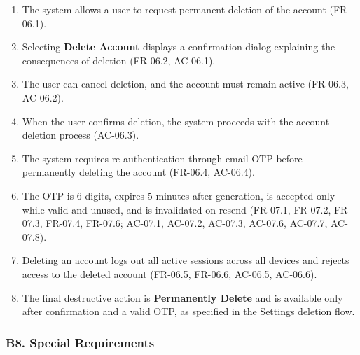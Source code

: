\documentclass[12pt]{article}
\begin{document}
\begin{enumerate}
\item The system allows a user to request permanent deletion of the account (FR-06.1).
\item Selecting \textbf{Delete Account} displays a confirmation dialog explaining the consequences of deletion (FR-06.2, AC-06.1).
\item The user can cancel deletion, and the account must remain active (FR-06.3, AC-06.2).
\item When the user confirms deletion, the system proceeds with the account deletion process (AC-06.3).
\item The system requires re-authentication through email OTP before permanently deleting the account (FR-06.4, AC-06.4).
\item The OTP is 6 digits, expires 5 minutes after generation, is accepted only while valid and unused, and is invalidated on resend (FR-07.1, FR-07.2, FR-07.3, FR-07.4, FR-07.6; AC-07.1, AC-07.2, AC-07.3, AC-07.6, AC-07.7, AC-07.8).
\item Deleting an account logs out all active sessions across all devices and rejects access to the deleted account (FR-06.5, FR-06.6, AC-06.5, AC-06.6).
\item The final destructive action is \textbf{Permanently Delete} and is available only after confirmation and a valid OTP, as specified in the Settings deletion flow.
\end{enumerate}
\par\medskip

\hypertarget{sec:b8-special-requirements}{}
\subsubsection*{B8. Special Requirements}
\par\medskip
\end{document}
